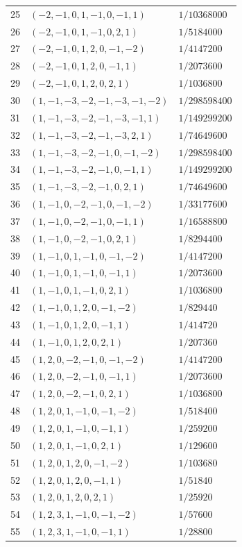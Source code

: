 \begin{longtable}{@{}rll@{}}
25 & $(-2,-1,0,1,-1,0,-1,1)$ & $1/10368000$\\
26 & $(-2,-1,0,1,-1,0,2,1)$ & $1/5184000$\\
27 & $(-2,-1,0,1,2,0,-1,-2)$ & $1/4147200$\\
28 & $(-2,-1,0,1,2,0,-1,1)$ & $1/2073600$\\
29 & $(-2,-1,0,1,2,0,2,1)$ & $1/1036800$\\
30 & $(1,-1,-3,-2,-1,-3,-1,-2)$ & $1/298598400$\\
31 & $(1,-1,-3,-2,-1,-3,-1,1)$ & $1/149299200$\\
32 & $(1,-1,-3,-2,-1,-3,2,1)$ & $1/74649600$\\
33 & $(1,-1,-3,-2,-1,0,-1,-2)$ & $1/298598400$\\
34 & $(1,-1,-3,-2,-1,0,-1,1)$ & $1/149299200$\\
35 & $(1,-1,-3,-2,-1,0,2,1)$ & $1/74649600$\\
36 & $(1,-1,0,-2,-1,0,-1,-2)$ & $1/33177600$\\
37 & $(1,-1,0,-2,-1,0,-1,1)$ & $1/16588800$\\
38 & $(1,-1,0,-2,-1,0,2,1)$ & $1/8294400$\\
39 & $(1,-1,0,1,-1,0,-1,-2)$ & $1/4147200$\\
40 & $(1,-1,0,1,-1,0,-1,1)$ & $1/2073600$\\
41 & $(1,-1,0,1,-1,0,2,1)$ & $1/1036800$\\
42 & $(1,-1,0,1,2,0,-1,-2)$ & $1/829440$\\
43 & $(1,-1,0,1,2,0,-1,1)$ & $1/414720$\\
44 & $(1,-1,0,1,2,0,2,1)$ & $1/207360$\\
45 & $(1,2,0,-2,-1,0,-1,-2)$ & $1/4147200$\\
46 & $(1,2,0,-2,-1,0,-1,1)$ & $1/2073600$\\
47 & $(1,2,0,-2,-1,0,2,1)$ & $1/1036800$\\
48 & $(1,2,0,1,-1,0,-1,-2)$ & $1/518400$\\
49 & $(1,2,0,1,-1,0,-1,1)$ & $1/259200$\\
50 & $(1,2,0,1,-1,0,2,1)$ & $1/129600$\\
51 & $(1,2,0,1,2,0,-1,-2)$ & $1/103680$\\
52 & $(1,2,0,1,2,0,-1,1)$ & $1/51840$\\
53 & $(1,2,0,1,2,0,2,1)$ & $1/25920$\\
54 & $(1,2,3,1,-1,0,-1,-2)$ & $1/57600$\\
55 & $(1,2,3,1,-1,0,-1,1)$ & $1/28800$\\

\end{longtable}
